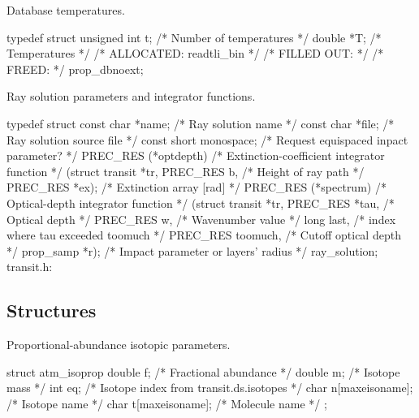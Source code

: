 \documentclass[letterpaper,12pt]{article}
\begin{document}
\noindent \newline
Database temperatures.
\begin{plain}
typedef struct {    
  unsigned int t;   /* Number of temperatures				    */
  double *T;        /* Temperatures                                         */
    /* ALLOCATED:	readtli_bin					    */
    /* FILLED OUT:							    */
    /* FREED: 								    */
} prop_dbnoext;
\end{plain}

\noindent \newline
Ray solution parameters and integrator functions.
\begin{plain}
typedef struct {
  const char *name;          /* Ray solution name                           */
  const char *file;          /* Ray solution source file                    */
  const short monospace;     /* Request equispaced inpact parameter?        */
  PREC_RES (*optdepth)       /* Extinction-coefficient integrator function  */
       (struct transit *tr,
        PREC_RES b,              /* Height of ray path                      */
        PREC_RES *ex);           /* Extinction array [rad]                  */
  PREC_RES (*spectrum)       /* Optical-depth integrator function           */
        (struct transit *tr,
         PREC_RES *tau,          /* Optical depth                           */
         PREC_RES w,             /* Wavenumber value                        */
         long last,              /* index where tau exceeded toomuch        */
         PREC_RES toomuch,       /* Cutoff optical depth                    */
         prop_samp *r);          /* Impact parameter or layers' radius      */
} ray_solution;	transit.h:
\end{plain}


\subsection{Structures}

Proportional-abundance isotopic parameters.
\begin{plain}
struct atm_isoprop{
  double f;            /* Fractional abundance                        */
  double m;            /* Isotope mass                                */
  int eq;              /* Isotope index from transit.ds.isotopes      */
  char n[maxeisoname]; /* Isotope name                                */
  char t[maxeisoname]; /* Molecule name                               */
};
\end{plain}
\end{document}
